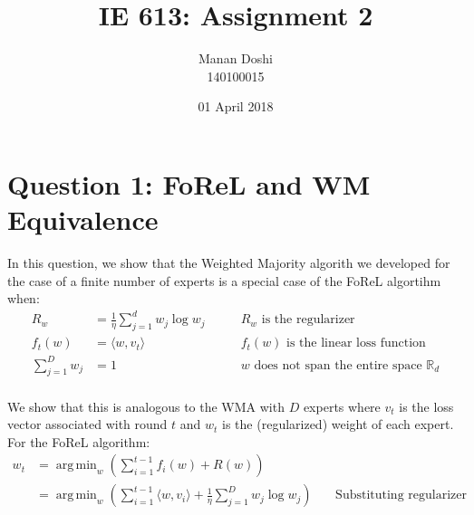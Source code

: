 \documentclass{article}
\title{IE 613: Assignment 2}
\author{Manan Doshi \\ 140100015}
\date{01 April 2018}
\DeclareMathOperator*{\argmin}{arg\,min}
\begin{document}
\graphicspath{{./plots}}
\maketitle

\section*{Question 1: FoReL and WM Equivalence}

In this question, we show that the Weighted Majority algorith we developed for the case of a finite number of experts is a special case of the FoReL algortihm when:
\begin{align*}
    R_w  &= \frac{1}{\eta}\sum_{j=1}^{d} w_j \log w_j \qquad &\text{$R_w$ is the regularizer}\\
    f_t(w) &= \langle w,v_t \rangle \qquad &\text{$f_t(w)$ is the linear loss function}\\
    \sum_{j=1}^{D} w_j &= 1 \qquad &\text{$w$ does not span the entire space $\mathbb{R}_d$}\\
\end{align*}

We show that this is analogous to the WMA with $D$ experts where $v_t$ is the loss vector associated with round $t$ and $w_t$ is the (regularized) weight of each expert.\\
For the FoReL algorithm:
\begin{align*}
    w_t &= \argmin_{w} \left( \sum_{i=1}^{t-1} f_i(w) + R(w) \right) &\qquad\\
    &= \argmin_{w} \left( \sum_{i=1}^{t-1} \langle w,v_i \rangle + \frac{1}{\eta} \sum_{j=1}^{D} w_j \log w_j \right) &\qquad \text{Substituting regularizer and loss terms}\\
\end{align*}
\end{document}
